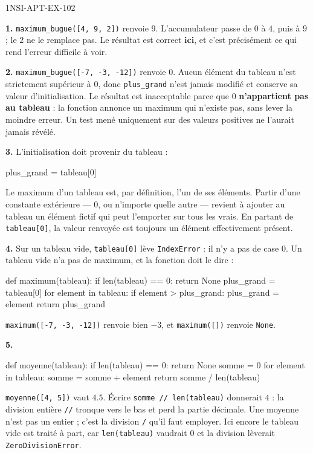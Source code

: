 \begin{corrige}{1NSI-APT-EX-102}

\textbf{1.} \lstinline{maximum_bugue([4, 9, 2])} renvoie $9$. L'accumulateur passe de $0$ à
$4$, puis à $9$ ; le $2$ ne le remplace pas. Le résultat est correct \textbf{ici}, et c'est
précisément ce qui rend l'erreur difficile à voir.

\textbf{2.} \lstinline{maximum_bugue([-7, -3, -12])} renvoie $0$. Aucun élément du tableau
n'est strictement supérieur à $0$, donc \lstinline{plus_grand} n'est jamais modifié et
conserve sa valeur d'initialisation. Le résultat est inacceptable parce que $0$
\textbf{n'appartient pas au tableau} : la fonction annonce un maximum qui n'existe pas, sans
lever la moindre erreur. Un test mené uniquement sur des valeurs positives ne l'aurait
jamais révélé.

\textbf{3.} L'initialisation doit provenir du tableau :
\begin{python}
plus_grand = tableau[0]
\end{python}
Le maximum d'un tableau est, par définition, l'un de ses éléments. Partir d'une constante
extérieure — $0$, ou n'importe quelle autre — revient à ajouter au tableau un élément
fictif qui peut l'emporter sur tous les vrais. En partant de \lstinline{tableau[0]}, la
valeur renvoyée est toujours un élément effectivement présent.

\textbf{4.} Sur un tableau vide, \lstinline{tableau[0]} lève \lstinline{IndexError} : il n'y
a pas de case $0$. Un tableau vide n'a pas de maximum, et la fonction doit le dire :
\begin{python}
def maximum(tableau):
    if len(tableau) == 0:
        return None
    plus_grand = tableau[0]
    for element in tableau:
        if element > plus_grand:
            plus_grand = element
    return plus_grand
\end{python}
\lstinline{maximum([-7, -3, -12])} renvoie bien $-3$, et \lstinline{maximum([])} renvoie
\lstinline{None}.

\textbf{5.}
\begin{python}
def moyenne(tableau):
    if len(tableau) == 0:
        return None
    somme = 0
    for element in tableau:
        somme = somme + element
    return somme / len(tableau)
\end{python}
\lstinline{moyenne([4, 5])} vaut $4.5$. Écrire \lstinline{somme // len(tableau)} donnerait
$4$ : la division entière \lstinline{//} tronque vers le bas et perd la partie décimale.
Une moyenne n'est pas un entier ; c'est la division \lstinline{/} qu'il faut employer. Ici
encore le tableau vide est traité à part, car \lstinline{len(tableau)} vaudrait $0$ et la
division lèverait \lstinline{ZeroDivisionError}.

\end{corrige}
